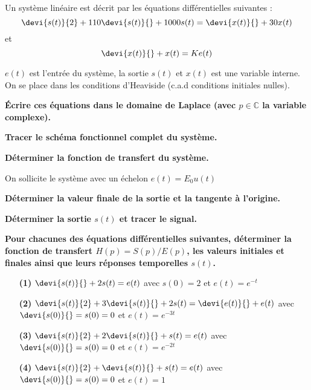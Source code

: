Un système linéaire est décrit par les équations différentielles suivantes :
$$
\devi{s(t)}{2} + 110 \devi{s(t)}{} + 1000 s(t) = \devi{x(t)}{} + 30 x(t)
$$
et 
$$
\devi{x(t)}{} + x(t) = K e(t) 
$$

$e(t)$ est l'entrée du système, la sortie $s(t)$ et $x(t)$ est une variable
interne. On se place dans les conditions d'Heaviside (c.a.d conditions 
initiales nulles).\newline

\question{}
\textbf{\'Ecrire ces équations dans le domaine de Laplace (avec 
$p\in\mathbb{C}$ la variable complexe).}

\question{}
\textbf{Tracer le schéma fonctionnel complet du système.}

\question{}
\textbf{Déterminer la fonction de transfert du système.}
\newline

On sollicite le système avec un échelon $e(t)=E_0 u(t)$

\question{}
\textbf{Déterminer la valeur finale de la sortie et la tangente à l'origine.}

\question{}
\textbf{Déterminer la sortie $s(t)$ et tracer le signal.}


\question{}
\textbf{Pour chacunes des équations différentielles suivantes, 
déterminer la fonction de transfert $H(p) = S(p)/E(p)$, les valeurs initiales
et finales ainsi que leurs réponses temporelles $s(t)$.}

\begin{itemize}
\item[\textbf{(1)}] $\devi{s(t)}{} + 2s(t) = e(t) $ avec $s(0)=2$ 
                    et $e(t) = e^{-t}$
\item[\textbf{(2)}] $\devi{s(t)}{2} + 3 \devi{s(t)}{} + 2s(t) 
                    = \devi{e(t)}{} + e(t)$ 
                    avec $\devi{s(0)}{}=s(0)=0$ et $e(t) = e^{-3t}$
\item[\textbf{(3)}] $\devi{s(t)}{2} + 2\devi{s(t)}{} + s(t)  = e(t)$ 
                    avec $\devi{s(0)}{}=s(0)=0$ et $e(t) = e^{-2t}$
\item[\textbf{(4)}] $\devi{s(t)}{2} + \devi{s(t)}{} + s(t) = e(t)$ 
                    avec $\devi{s(0)}{}=s(0)=0$ et $e(t) = 1$
\end{itemize}


